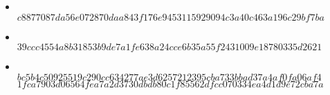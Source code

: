 	\begin{itemize}
	
	\item {}\\
$c8877087da56e072870daa843f176e9453115929094c3a40c463a196c29bf7ba$
\item {}\\
$39ccc4554a8b31853b9de7a1fe638a24cce6b35a55f2431009e18780335d2621$
\item {}\\
$bc5b4c50925519c290cc634277ae3d6257212395cba733bbad37a4af0fa06af4$\\
$1fca7903d06564fea7a2d3730dbdb80c1f85562dfcc070334ea4d1d9e72cba7a$

	\end{itemize}
\begin{thebibliography}{1}


  
\end{thebibliography}
